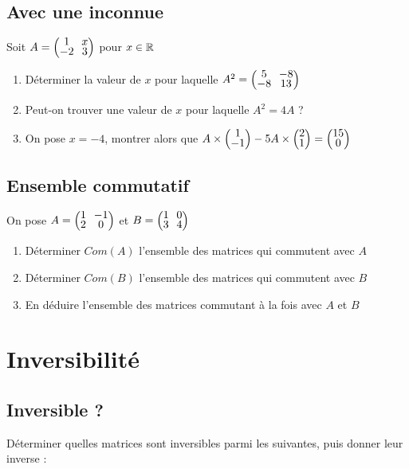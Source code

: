 \documentclass[oneside,12pt]{book}          %
\begin{document}
\subsection{Avec une inconnue}
Soit $A=\matrice{1&x\\-2&3} $ pour ${x\in\mathbb R}$
\begin{enumerate}
    \item Déterminer la valeur de $x$ pour laquelle $A^2=\matrice{5&-8\\-8&13}$
    \item Peut-on trouver une valeur de $x$ pour laquelle $A^2=4A$ ?
    \item On pose $x=-4$, montrer alors que $A\times\matrice{1\\-1}-5A\times\matrice{2\\1}=\matrice{15\\0}  $
\end{enumerate}



\subsection{Ensemble commutatif}
On pose $A=\matrice{1&-1\\2&0}$ et $B=\matrice{1&0\\3&4}$
\begin{enumerate}
    \item Déterminer $Com(A)$ l'ensemble des matrices qui commutent avec $A$
    \item Déterminer $Com(B)$ l'ensemble des matrices qui commutent avec $B$
    \item En déduire l'ensemble des matrices commutant à la fois avec $A$ et $B$
\end{enumerate}



\section{Inversibilité}

\subsection{Inversible ?}
Déterminer quelles matrices sont inversibles parmi les suivantes, puis donner leur inverse :
\end{document}
